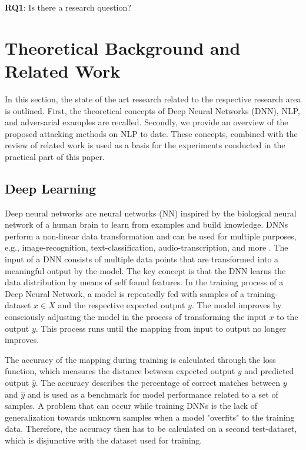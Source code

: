 \textbf{RQ1}: Is there a research question?


\section{Theoretical Background and Related Work}

In this section, the state of the art research related to the respective research area is outlined. First, the theoretical concepts of Deep Neural Networks (DNN), NLP, and adversarial examples are recalled. Secondly, we provide an overview of the proposed attacking methods on NLP to date. These concepts, combined with the review of related work is used as a basis for the experiments conducted in the practical part of this paper. 

\subsection{Deep Learning}

Deep neural networks are neural networks (NN) inspired by the biological neural network of a human brain to learn from examples and build knowledge. 
DNNs perform a  non-linear data transformation and can be used for multiple purposes, e.g., image-recognition, text-classification, audio-transcription, and more \cite{rawat2017deep}.
The input of a DNN consists of multiple data points that are transformed into a meaningful output by the model. The key concept is that the DNN learns the data distribution by means of self found features.
In the training process of a Deep Neural Network, a model is repeatedly fed with samples of a training-dataset $x \in X$ and the respective expected output $y$.  The model improves by consciously adjusting the model in the process of transforming the input $x$ to the output $y$.  This process runs until the mapping from input to output no longer improves. 

The accuracy of the mapping during training is calculated through the loss function, which measures the distance between expected output $y$ and predicted output $\hat{y}$.
The accuracy describes the percentage of correct matches between $y$ and $\hat{y}$ and is used as a benchmark for model performance related to a set of samples. 
A problem that can occur while training DNNs is the lack of generalization towards unknown samples when a model "overfits" to the training data.
Therefore, the accuracy then has to be calculated on a second test-dataset, which is disjunctive with the dataset used for training.

